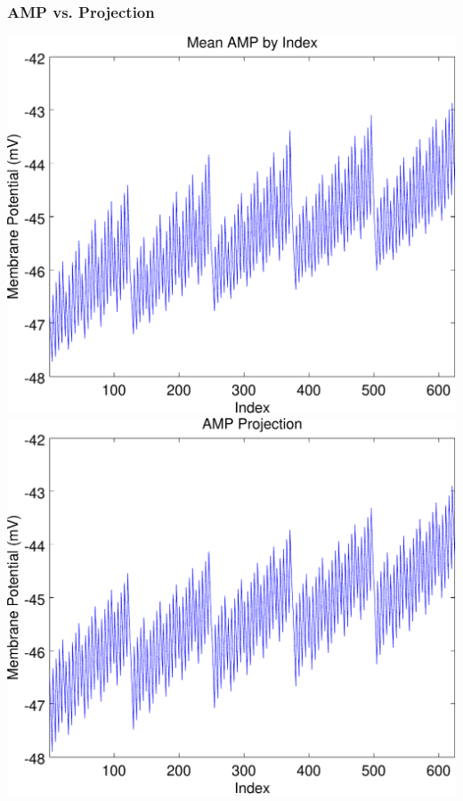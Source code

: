 \documentclass{beamer}
\theoremstyle{plain}
\theoremstyle{definition}
\begin{document}
\begin{frame}\frametitle{AMP vs. Projection}
  \begin{center}
    \includegraphics[scale=.32]{AMP.pdf}%
    \includegraphics[scale=.32]{AMPProjection.pdf}
  \end{center}
\end{frame}

\end{document}
